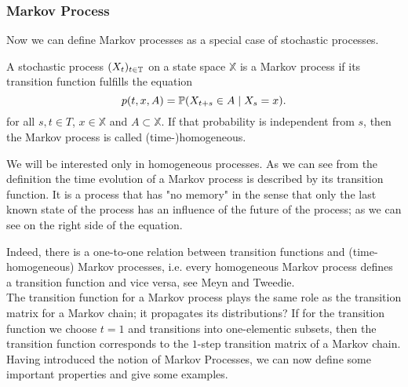 \subsubsection*{Markov Process}
Now we can define Markov processes as a special case of stochastic processes.

\begin{defi}[Markov Process]
A stochastic process $(X_t)_{t\in\mathbb{T}}$ on a state space $\mathbb{X}$ is a Markov process if its transition function fulfills the equation
\begin{equation}
p(t,x,A) = \mathbb{P} (X_{t+s} \in A \mid X_s =x).
\end{equation}
for all $s,t \in T$, $x \in \mathbb{X}$ and $A \subset \mathbb{X}$. If that probability is independent from $s$, then the Markov process is called (time-)homogeneous.
\end{defi}
We will be interested only in homogeneous processes. 
As we can see from the definition the time evolution of a Markov process is described by its transition function.
It is a process that has "no memory" in the sense that only the last known state of the process has an influence of the future of the process; as we can see on the right side of the equation.



Indeed, there is a one-to-one relation between transition functions and (time-homogeneous) Markov processes, i.e. every homogeneous Markov process defines a transition function and vice versa, see Meyn and Tweedie\cite[chapter 3]{meyn1993}.
\\

The transition function for a Markov process plays the same role as the transition matrix for a Markov chain; it propagates its distributions?
If for the transition function we choose $t=1$ and transitions into one-elementic subsets, then the transition function corresponds to the $1$-step transition matrix of a Markov chain.
Having introduced the notion of Markov Processes, we can now define some important properties and give some examples.

